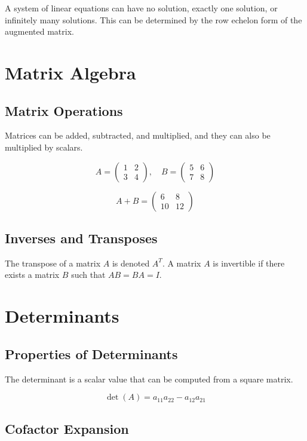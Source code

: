 \documentclass{article}
\begin{document}
A system of linear equations can have no solution, exactly one solution, or infinitely many solutions. This can be determined by the row echelon form of the augmented matrix.

\section{Matrix Algebra}

\subsection{Matrix Operations}

Matrices can be added, subtracted, and multiplied, and they can also be multiplied by scalars.

\[
A = \begin{pmatrix}
1 & 2 \\
3 & 4
\end{pmatrix}, \quad B = \begin{pmatrix}
5 & 6 \\
7 & 8
\end{pmatrix}
\]

\[
A + B = \begin{pmatrix}
6 & 8 \\
10 & 12
\end{pmatrix}
\]

\subsection{Inverses and Transposes}

The transpose of a matrix \(A\) is denoted \(A^T\). A matrix \(A\) is invertible if there exists a matrix \(B\) such that \(AB = BA = I\).

\section{Determinants}

\subsection{Properties of Determinants}

The determinant is a scalar value that can be computed from a square matrix.

\[
\det(A) = a_{11}a_{22} - a_{12}a_{21}
\]

\subsection{Cofactor Expansion}
\end{document}
